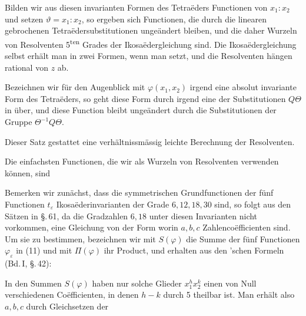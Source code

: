 
Bilden wir aus diesen invarianten Formen des Tetra\"eders Functionen von $x_1:x_2$ und setzen $\vartheta = x_1:x_2$, so ergeben sich Functionen, die durch die linearen gebrochenen Tetra\"edersubstitutionen unge\"andert bleiben, und die daher Wurzeln von Resolventen 5\textsuperscript{ten} Grades der Ikosa\"edergleichung sind. Die Ikosa\"edergleichung selbst erh\"alt man in zwei Formen, wenn man
setzt, und die Resolventen h\"angen rational von $z$ ab.

Bezeichnen wir f\"ur den Augenblick mit $\varphi(x_1, x_2)$ irgend eine absolut invariante Form des Tetra\"eders, so geht diese Form durch irgend eine der Substitutionen $Q\Theta$ in
\"uber, und diese Function bleibt unge\"andert durch die Substitutionen der Gruppe $\Theta^{-1}Q\Theta$.


Dieser Satz gestattet eine verh\"altnissm\"assig leichte Berechnung der Resolventen.

Die einfachsten Functionen, die wir als Wurzeln von Resolventen verwenden k\"onnen, sind

Bemerken wir zun\"achst, dass die symmetrischen Grundfunctionen der f\"unf Functionen $t_\varepsilon$ Ikosa\"ederinvarianten der Grade $6, 12, 18, 30$ sind, so folgt aus den S\"atzen in \S.\,61, da die Gradzahlen $6, 18$ unter diesen Invarianten nicht vorkommen, eine Gleichung von der Form
worin $a, b, c$ Zahlenco\"efficienten sind. Um sie zu bestimmen, bezeichnen wir mit $S(\varphi)$ die Summe der f\"unf Functionen $\varphi_\varepsilon$ in (11) und mit $\Pi(\varphi)$ ihr Product, und erhalten aus den 'schen Formeln (Bd.\,I, \S.\,42):

In den Summen $S(\varphi)$ haben nur solche Glieder $x_1^h x_2^k$ einen von Null verschiedenen Co\"efficienten, in denen $h - k$ durch 5 theilbar ist. Man erh\"alt also $a, b, c$ durch Gleichsetzen der
